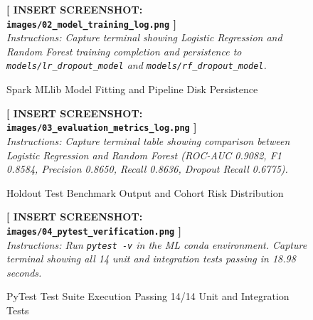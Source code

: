 \documentclass[11pt,a4paper]{article}
\begin{document}
\begin{figure}[H]
    \centering
    \begin{tcolorbox}[colback=gray!10,colframe=gray!60,title=\textbf{SCREENSHOT 2: MLlib Model Training \& Serialization Output}]
        \vspace{3.5cm}
        \centering
        \textbf{[ INSERT SCREENSHOT: \texttt{images/02\_model\_training\_log.png} ]}\\[6pt]
        \textit{Instructions: Capture terminal showing Logistic Regression and Random Forest training completion and persistence to \texttt{models/lr\_dropout\_model} and \texttt{models/rf\_dropout\_model}.}
        \vspace{0.5cm}
    \end{tcolorbox}
    \caption{Spark MLlib Model Fitting and Pipeline Disk Persistence}
    \label{fig:exec_training}
\end{figure}

\begin{figure}[H]
    \centering
    \begin{tcolorbox}[colback=gray!10,colframe=gray!60,title=\textbf{SCREENSHOT 3: Holdout Evaluation Benchmark Table in Terminal}]
        \vspace{3.5cm}
        \centering
        \textbf{[ INSERT SCREENSHOT: \texttt{images/03\_evaluation\_metrics\_log.png} ]}\\[6pt]
        \textit{Instructions: Capture terminal table showing comparison between Logistic Regression and Random Forest (ROC-AUC 0.9082, F1 0.8584, Precision 0.8650, Recall 0.8636, Dropout Recall 0.6775).}
        \vspace{0.5cm}
    \end{tcolorbox}
    \caption{Holdout Test Benchmark Output and Cohort Risk Distribution}
    \label{fig:exec_metrics}
\end{figure}

\begin{figure}[H]
    \centering
    \begin{tcolorbox}[colback=gray!10,colframe=gray!60,title=\textbf{SCREENSHOT 4: Automated PyTest Suite Verification}]
        \vspace{3.5cm}
        \centering
        \textbf{[ INSERT SCREENSHOT: \texttt{images/04\_pytest\_verification.png} ]}\\[6pt]
        \textit{Instructions: Run \texttt{pytest -v} in the ML conda environment. Capture terminal showing all 14 unit and integration tests passing in 18.98 seconds.}
        \vspace{0.5cm}
    \end{tcolorbox}
    \caption{PyTest Test Suite Execution Passing 14/14 Unit and Integration Tests}
    \label{fig:exec_pytest}
\end{figure}
\end{document}
